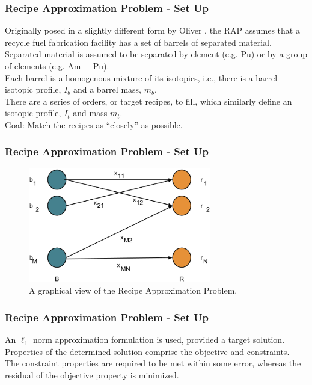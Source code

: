\begin{frame}[ctb!]
  \frametitle{Recipe Approximation Problem - Set Up} 

  Originally posed in a slightly different form by Oliver
  \cite{oliver_geniusv2:_2009}, the RAP assumes that a recycle fuel fabrication
  facility has a set of barrels of separated material.\\

  Separated material is assumed to be separated by element (e.g. Pu) or by a
  group of elements (e.g. Am + Pu).\\

  Each barrel is a homogenous mixture of its isotopics, i.e., there is a barrel
  isotopic profile, $I_b$ and a barrel mass, $m_b$.\\

  There are a series of orders, or target recipes, to fill, which similarly
  define an isotopic profile, $I_t$ and mass $m_t$.\\

  Goal: Match the recipes as ``closely'' as possible.
\end{frame}

\begin{frame}[ctb!]
  \frametitle{Recipe Approximation Problem - Set Up} 
    \begin{figure}
    \includegraphics[height=5cm]{./images/rap.eps}
    \caption{A graphical view of the Recipe Approximation Problem.}
  \end{figure}
\end{frame}

\begin{frame}[ctb!]
  \frametitle{Recipe Approximation Problem - Set Up} 

  An $\ell_1$ norm approximation formulation is used, provided a target
  solution.\\
  
  Properties of the determined solution comprise the objective and
  constraints.\\

  The constraint properties are required to be met within some error, whereas
  the residual of the objective property is minimized.
\end{frame}

